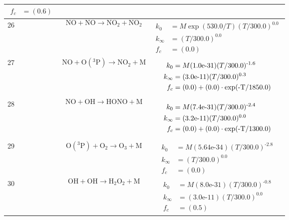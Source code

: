 \begin{longtable}{| m{} | m{}| m{} |}
$$\begin{aligned}
    f_c &= (\textrm{0.6}) 
\end{aligned}
$$
 \\
\hline
 26 & $$ \mathrm{NO} + \mathrm{NO}\longrightarrow \mathrm{NO_2} + \mathrm{NO_2} $$ & $$
\begin{aligned}
    k_0 &= M\exp(\textrm{530.0}/T)(T/\textrm{300.0})^{\textrm{0.0}} \\
    k_{\infty} &= (T/\textrm{300.0})^{\textrm{0.0}} \\
    f_c &= (\textrm{0.0}) 
\end{aligned}
$$
 \\
\hline
 27 & $$ \mathrm{NO} + \mathrm{O(^3P)}\longrightarrow \mathrm{NO_2} + \mathrm{M} $$ & $$
\begin{aligned}
    k_0 &= M(\textrm{1.0e-31})(T/\textrm{300.0})^{\textrm{-1.6}} \\
    k_{\infty} &= (\textrm{3.0e-11})(T/\textrm{300.0})^{\textrm{0.3}} \\
    f_c &= (\textrm{0.0}) + (\textrm{0.0})\cdot\exp(\textrm{-T/\textrm{1850.0}}) 
\end{aligned}
$$
 \\
\hline
 28 & $$ \mathrm{NO} + \mathrm{OH}\longrightarrow \mathrm{HONO} + \mathrm{M} $$ & $$
\begin{aligned}
    k_0 &= M(\textrm{7.4e-31})(T/\textrm{300.0})^{\textrm{-2.4}} \\
    k_{\infty} &= (\textrm{3.2e-11})(T/\textrm{300.0})^{\textrm{0.0}} \\
    f_c &= (\textrm{0.0}) + (\textrm{0.0})\cdot\exp(\textrm{-T/\textrm{1300.0}}) 
\end{aligned}
$$
 \\
\hline
 29 & $$ \mathrm{O(^3P)} + \mathrm{O_2}\longrightarrow \mathrm{O_3} + \mathrm{M} $$ & $$
\begin{aligned}
    k_0 &= M(\textrm{5.64e-34})(T/\textrm{300.0})^{\textrm{-2.8}} \\
    k_{\infty} &= (T/\textrm{300.0})^{\textrm{0.0}} \\
    f_c &= (\textrm{0.0}) 
\end{aligned}
$$
 \\
\hline
 30 & $$ \mathrm{OH} + \mathrm{OH}\longrightarrow \mathrm{H_2O_2} + \mathrm{M} $$ & $$
\begin{aligned}
    k_0 &= M(\textrm{8.0e-31})(T/\textrm{300.0})^{\textrm{-0.8}} \\
    k_{\infty} &= (\textrm{3.0e-11})(T/\textrm{300.0})^{\textrm{0.0}} \\
    f_c &= (\textrm{0.5}) 

\end{aligned}$$
\end{longtable}

